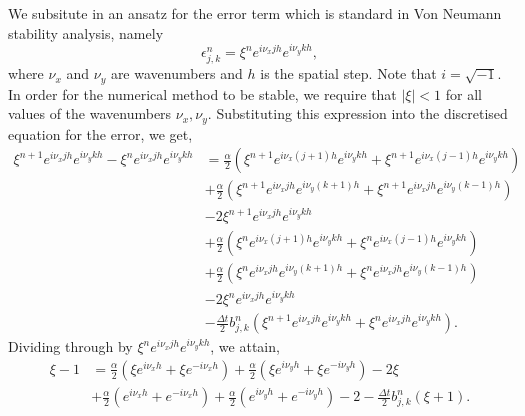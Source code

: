 We subsitute in an ansatz for the error term which is standard in Von Neumann stability analysis, namely
\begin{equation*}
    \epsilon_{j,k}^n = \xi^n e^{i \nu_x j h} e^{i \nu_y k h},
\end{equation*}
where $\nu_x$ and $\nu_y$ are wavenumbers and $h$ is the spatial step. Note that $i = \sqrt{-1}$. In order for the numerical
method to be stable, we require that $|\xi| < 1$ for all values of the wavenumbers $\nu_x, \nu_y$.
Substituting this expression into the discretised equation for the error, we get,
\begin{equation*}
    \begin{split}
        \xi^{n+1} e^{i \nu_x j h} e^{i \nu_y k h} - \xi^{n} e^{i \nu_x j h} e^{i \nu_y k h} &=
       \frac{\alpha}{2}  \left( \xi^{n+1} e^{i \nu_x (j+1) h} e^{i \nu_y k h} + \xi^{n+1} e^{i \nu_x (j-1) h} e^{i \nu_y k h} \right) \\
       &+ \frac{\alpha}{2}\left( \xi^{n+1} e^{i \nu_x j h} e^{i \nu_y (k+1) h} + \xi^{n+1} e^{i \nu_x j h} e^{i \nu_y (k-1) h}  \right) \\
       &-2 \xi^{n+1} e^{i \nu_x j h} e^{i \nu_y k h}  \\
       &+\frac{\alpha}{2} \left( \xi^{n} e^{i \nu_x (j+1) h} e^{i \nu_y k h}+ \xi^{n} e^{i \nu_x (j-1) h} e^{i \nu_y k h}\right) \\
       &+ \frac{\alpha}{2}\left(\xi^{n} e^{i \nu_x j h} e^{i \nu_y (k+1) h} + \xi^{n} e^{i \nu_x j h} e^{i \nu_y (k-1) h}  \right) \\
       &-2 \xi^{n} e^{i \nu_x j h} e^{i \nu_y k h}\\
       &-\frac{\Delta t}{2} b_{j,k}^{n} (\xi^{n+1} e^{i \nu_x j h} e^{i \nu_y k h} + \xi^{n} e^{i \nu_x j h} e^{i \nu_y k h}).
    \end{split}
\end{equation*}
Dividing through by $\xi^{n} e^{i \nu_x j h} e^{i \nu_y k h}$, we attain,
\begin{equation*}
    \begin{split}
        \xi - 1 &=
       \frac{\alpha}{2}  \left( \xi e^{i \nu_x h}+ \xi e^{-i \nu_x h} \right) 
       + \frac{\alpha}{2}\left( \xi  e^{i \nu_y h} + \xi  e^{-i \nu_y h}  \right) 
       -2 \xi   \\
       &+\frac{\alpha}{2} \left(  e^{i \nu_x  h}+  e^{-i \nu_x h}\right)
       + \frac{\alpha}{2}\left(   e^{i \nu_y h} +   e^{-i \nu_y  h}  \right) 
       -2
       -\frac{\Delta t}{2} b_{j,k}^{n} (\xi + 1).
    \end{split}
\end{equation*}
